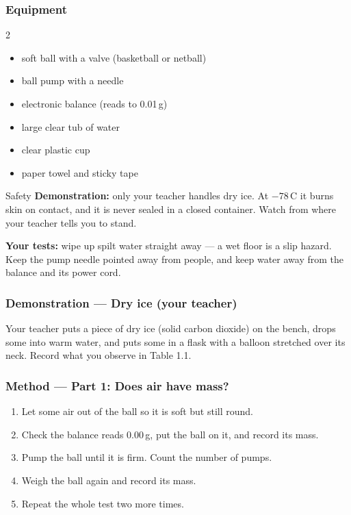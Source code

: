 \documentclass[11pt,a4paper]{article}
\begin{document}
\subsubsection*{Equipment}
\begin{multicols}{2}
\begin{itemize}[leftmargin=1.2em, itemsep=0pt, topsep=0pt]
  \item soft ball with a valve (basketball or netball)
  \item ball pump with a needle
  \item electronic balance (reads to 0.01\,g)
  \item large clear tub of water
  \item clear plastic cup
  \item paper towel and sticky tape
\end{itemize}
\end{multicols}

\begin{infobox}{Safety}
\textbf{Demonstration:} only your teacher handles dry ice. At $-78$\,\textdegree C it burns skin on contact, and it is never sealed in a closed container. Watch from where your teacher tells you to stand.\par
\textbf{Your tests:} wipe up spilt water straight away --- a wet floor is a slip hazard. Keep the pump needle pointed away from people, and keep water away from the balance and its power cord.
\end{infobox}

\subsubsection*{Demonstration --- Dry ice (your teacher)}
Your teacher puts a piece of dry ice (solid carbon dioxide) on the bench, drops some into warm water, and puts some in a flask with a balloon stretched over its neck. Record what you observe in Table 1.1.

\subsubsection*{Method --- Part 1: Does air have mass?}
\begin{enumerate}[itemsep=2pt]
  \item Let some air out of the ball so it is soft but still round.
  \item Check the balance reads 0.00\,g, put the ball on it, and record its mass.
  \item Pump the ball until it is firm. Count the number of pumps.
  \item Weigh the ball again and record its mass.
  \item Repeat the whole test two more times.
\end{enumerate}
\end{document}
